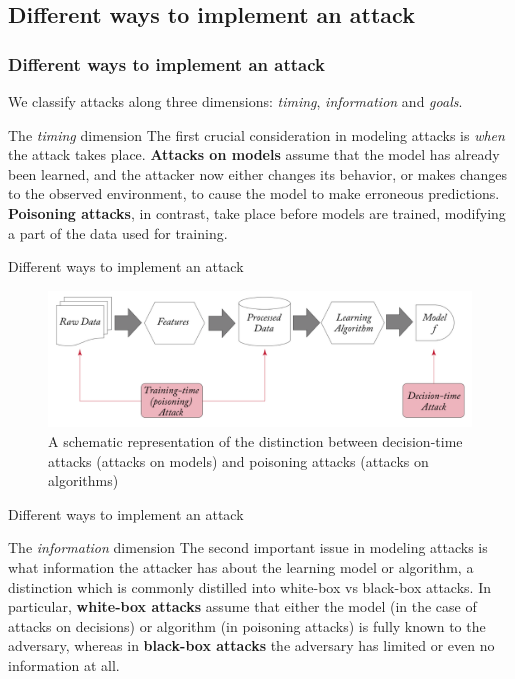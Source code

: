 \documentclass[8pt]{beamer}
\begin{document}
\subsection{Different ways to implement an attack}
\begin{frame}
\frametitle{Different ways to implement an attack}
We classify attacks along three dimensions: \textit{timing}, \textit{information} and \textit{goals}.
\begin{block}{The \textit{timing} dimension}
    The first crucial consideration in modeling attacks is \textit{when} the attack takes place. \textbf{Attacks on models} assume that the model has already been learned, and the attacker now either changes its behavior, or makes changes to the observed environment, to cause the model to make erroneous predictions. \textbf{Poisoning attacks}, in contrast, take place before models are trained, modifying a part of the data used for training.
\end{block}
\end{frame}

\begin{frame}{Different ways to implement an attack}
    \begin{figure} 
    \includegraphics[scale=0.2]{images/attack_dim.png}
    \caption{A schematic representation of the distinction between decision-time attacks (attacks on models) and poisoning attacks (attacks on algorithms)}
\end{figure}
\end{frame}

\begin{frame}{Different ways to implement an attack}
\begin{block}{The \textit{information} dimension}
The second important issue in modeling attacks is what information the attacker has about the learning model or algorithm, a distinction which is commonly distilled into white-box vs black-box attacks. In particular, \textbf{white-box attacks} assume that either the model (in the case of attacks on decisions) or algorithm (in poisoning attacks) is fully known to the adversary, whereas in \textbf{black-box attacks} the adversary has limited or even no information at all.
\end{block}
\end{frame}
\end{document}
